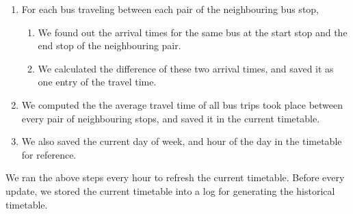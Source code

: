 \begin{enumerate}
  \item For each bus traveling between each pair of the neighbouring bus stop,
  \begin{enumerate}
    \item We found out the arrival times for the same bus at the start stop and the end stop of the neighbouring pair.
    \item We calculated the difference of these two arrival times, and saved it as one entry of the travel time.
  \end{enumerate}
  \item We computed the the average travel time of all bus trips took place between every pair of neighbouring stops, and saved it in the current timetable.
  \item We also saved the current day of week, and hour of the day in the timetable for reference.
\end {enumerate}

\par We ran the above steps every hour to refresh the current timetable. Before every update, we stored the current timetable into a log for generating the historical timetable.





